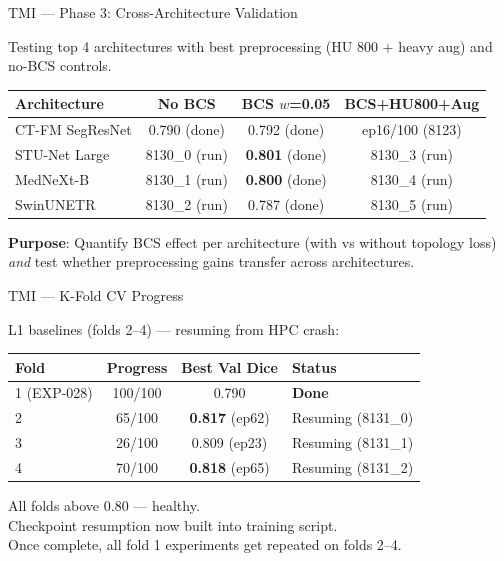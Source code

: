 \documentclass[aspectratio=169,10pt]{beamer}
\newcommand{\good}[1]{\textcolor{green!60!black}{\textbf{#1}}}
\begin{document}
\begin{frame}{TMI --- Phase 3: Cross-Architecture Validation}

Testing top 4 architectures with best preprocessing (HU 800 + heavy aug) and no-BCS controls.

\vspace{0.3cm}
\centering
\begin{tabular}{l c c c}
\toprule
\textbf{Architecture} & \textbf{No BCS} & \textbf{BCS $w$=0.05} & \textbf{BCS+HU800+Aug} \\
\midrule
CT-FM SegResNet & 0.790 (done) & 0.792 (done) & ep16/100 (8123) \\
STU-Net Large & 8130\_0 (run) & \good{0.801} (done) & 8130\_3 (run) \\
MedNeXt-B & 8130\_1 (run) & \good{0.800} (done) & 8130\_4 (run) \\
SwinUNETR & 8130\_2 (run) & 0.787 (done) & 8130\_5 (run) \\
\bottomrule
\end{tabular}

\vspace{0.3cm}
\textbf{Purpose}: Quantify BCS effect per architecture (with vs without topology loss) \textit{and} test whether preprocessing gains transfer across architectures.

\end{frame}

\begin{frame}{TMI --- K-Fold CV Progress}

L1 baselines (folds 2--4) --- resuming from HPC crash:

\vspace{0.3cm}
\centering
\begin{tabular}{l c c l}
\toprule
\textbf{Fold} & \textbf{Progress} & \textbf{Best Val Dice} & \textbf{Status} \\
\midrule
1 (EXP-028) & 100/100 & 0.790 & \good{Done} \\
2 & 65/100 & \good{0.817} (ep62) & Resuming (8131\_0) \\
3 & 26/100 & 0.809 (ep23) & Resuming (8131\_1) \\
4 & 70/100 & \good{0.818} (ep65) & Resuming (8131\_2) \\
\bottomrule
\end{tabular}

\vspace{0.3cm}
All folds above 0.80 --- healthy.\\
Checkpoint resumption now built into training script.\\
Once complete, all fold 1 experiments get repeated on folds 2--4.

\end{frame}
\end{document}

